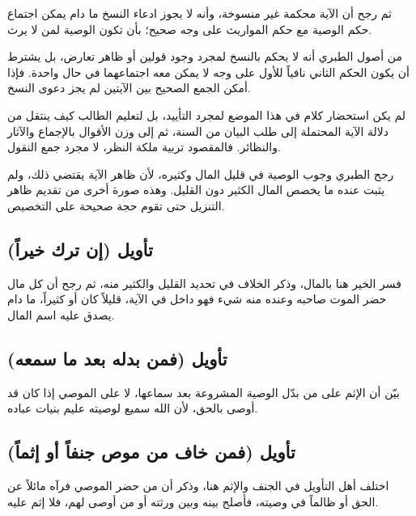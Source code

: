 ثم رجح  أن الآية محكمة غير منسوخة، وأنه لا يجوز ادعاء النسخ ما دام يمكن اجتماع حكم الوصية مع حكم المواريث على وجه صحيح؛ بأن تكون الوصية لمن لا يرث.

\begin{fawaid}
من أصول الطبري أنه لا يحكم بالنسخ لمجرد وجود قولين أو ظاهر تعارض، بل يشترط أن يكون الحكم الثاني نافياً للأول على وجه لا يمكن معه اجتماعهما في حال واحدة. فإذا أمكن الجمع الصحيح بين الآيتين لم يجز دعوى النسخ.
\end{fawaid}

\begin{fawaid}
لم يكن استحضار كلام  في هذا الموضع لمجرد التأييد، بل لتعليم الطالب كيف ينتقل من دلالة الآية المحتملة إلى طلب البيان من السنة، ثم إلى وزن الأقوال بالإجماع والآثار والنظائر. فالمقصود تربية ملكة النظر، لا مجرد جمع النقول.
\end{fawaid}

\begin{fawaid}
رجح الطبري وجوب الوصية في قليل المال وكثيره، لأن ظاهر الآية يقتضي ذلك، ولم يثبت عنده ما يخصص المال الكثير دون القليل. وهذه صورة أخرى من تقديم ظاهر التنزيل حتى تقوم حجة صحيحة على التخصيص.
\end{fawaid}

\subsection{تأويل (إن ترك خيراً)}
فسر  الخير هنا بالمال، وذكر الخلاف في تحديد القليل والكثير منه، ثم رجح أن كل مال حضر الموت صاحبه وعنده منه شيء فهو داخل في الآية، قليلاً كان أو كثيراً، ما دام يصدق عليه اسم المال.

\subsection{تأويل (فمن بدله بعد ما سمعه)}
بيّن  أن الإثم على من بدّل الوصية المشروعة بعد سماعها، لا على الموصي إذا كان قد أوصى بالحق، لأن الله سميع لوصيته عليم بنيات عباده.

\subsection{تأويل (فمن خاف من موص جنفاً أو إثماً)}
اختلف أهل التأويل في الجنف والإثم هنا، وذكر  أن من حضر الموصي فرآه مائلاً عن الحق أو ظالماً في وصيته، فأصلح بينه وبين ورثته أو من أوصى لهم، فلا إثم عليه.

